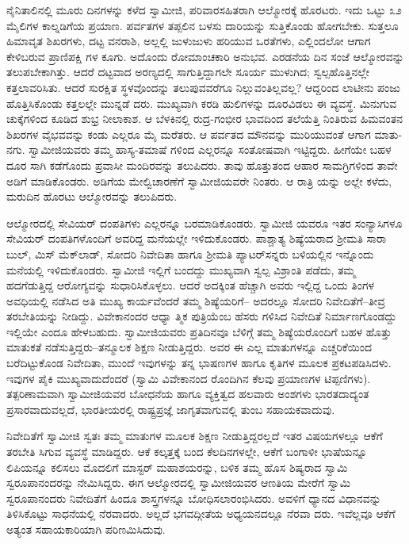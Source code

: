 ನೈನಿತಾಲಿನಲ್ಲಿ ಮೂರು ದಿನಗಳನ್ನು ಕಳೆದ ಸ್ವಾಮೀಜಿ, ಪರಿವಾರಸಹಿತರಾಗಿ ಆಲ್ಮೋರಕ್ಕೆ ಹೊರಟರು. ಇದು ಒಟ್ಟು ೩೨ ಮೈಲಿಗಳ ಕಾಲ್ನಡಿಗೆಯ ಪ್ರಯಾಣ. ಪರ್ವತಗಳ ತಪ್ಪಲಿನ ಬಳಸು ದಾರಿಯನ್ನು ಸುತ್ತಿಕೊಂಡು ಹೋಗಬೇಕು. ಸುತ್ತಲೂ ಹಿಮಾವೃತ ಶಿಖರಗಳು, ದಟ್ಟ ವನರಾಶಿ, ಅಲ್ಲಲ್ಲಿ ಜುಳುಜುಳು ಹರಿಯುವ ಒರತೆಗಳು, ಎಲ್ಲಿಂದಲೋ ಆಗಾಗ ಕೇಳಿಬರುವ ಪ್ರಾಣಿಪಕ್ಷಿ ಗಳ ಕೂಗು. ಅದೊಂದು ರೋಮಾಂಚಕಾರಿ ಅನುಭವ. ಎರಡನೆಯ ದಿನ ಸಂಜೆ ಆಲ್ಮೋರವನ್ನು ತಲುಪಬೇಕಾಗಿತ್ತು. ಆದರೆ ದಟ್ಟವಾದ ಅರಣ್ಯದಲ್ಲಿ ಸಾಗುತ್ತಿದ್ದಾಗಲೇ ಸೂರ್ಯ ಮುಳುಗಿದ; ಸ್ವಲ್ಪಹೊತ್ತಿನಲ್ಲೇ ಕತ್ತಲಾವರಿಸಿತು. ಆದರೆ ಸುರಕ್ಷಿತ ಸ್ಥಳವೊಂದನ್ನು ತಲುಪುವವರೆಗೂ ನಿಲ್ಲುವಂತಿಲ್ಲವಲ್ಲ? ಆದ್ದರಿಂದ ಲಾಟೀನು ಪಂಜು ಹೊತ್ತಿಸಿಕೊಂಡು ಕತ್ತಲಲ್ಲೇ ಮುನ್ನಡೆ ದರು. ಮುಖ್ಯವಾಗಿ ಕರಡಿ ಹುಲಿಗಳನ್ನು ದೂರವಿಡಲು ಈ ವ್ಯವಸ್ಥೆ. ಮಿನುಗುವ ಚುಕ್ಕೆಗಳಿಂದ ಕೂಡಿದ ಶುಭ್ರ ನೀಲಾಕಾಶ. ಆ ಬೆಳಕಿನಲ್ಲಿ ರುದ್ರ-ಗಂಭೀರ ಭಾವದಿಂದ ತಲೆಯೆತ್ತಿ ನಿಂತಿರುವ ಹಿಮವಂತನ ಶಿಖರಗಳ ವೈಭವವನ್ನು ಕಂಡು ಎಲ್ಲರೂ ಮೈ ಮರೆತರು. ಆ ಪರ್ವತದ ಮೌನವನ್ನು ಮುರಿಯುವಂತೆ ಆಗಾಗ ಮಾತು-ನಗು. ಸ್ವಾಮೀಜಿಯವರು ತಮ್ಮ ಹಾಸ್ಯ-ತಮಾಷೆ ಗಳಿಂದ ಎಲ್ಲರನ್ನೂ ಸಂತೋಷವಾಗಿ ಇಟ್ಟಿದ್ದರು. ಹೀಗೆಯೇ ಬಹಳ ದೂರ ಸಾಗಿ ಕಡೆಗೊಂದು ಪ್ರವಾಸೀ ಮಂದಿರವನ್ನು ತಲುಪಿದರು. ತಾವು ಹೊತ್ತುತಂದ ಆಹಾರ ಸಾಮಗ್ರಿಗಳಿಂದ ತಾವೇ ಅಡಿಗೆ ಮಾಡಿಕೊಂಡರು. ಅಡಿಗೆಯ ಮೇಲ್ವಿಚಾರಣೆಗೆ ಸ್ವಾಮೀಜಿಯವರೇ ನಿಂತರು. ಆ ರಾತ್ರಿ ಯನ್ನು ಅಲ್ಲೇ ಕಳೆದು, ಮರುದಿನ ಹೊರಟು ಆಲ್ಮೋರವನ್ನು ತಲುಪಿದರು.

ಆಲ್ಮೋರದಲ್ಲಿ ಸೇವಿಯರ್ ದಂಪತಿಗಳು ಎಲ್ಲರನ್ನೂ ಬರಮಾಡಿಕೊಂಡರು. ಸ್ವಾಮೀಜಿ ಯವರೂ ಇತರ ಸಂನ್ಯಾಸಿಗಳೂ ಸೇವಿಯರ್ ದಂಪತಿಗಳೊಂದಿಗೆ ಅವರಿದ್ದ ಮನೆಯಲ್ಲೇ ಇಳಿದುಕೊಂಡರು. ಪಾಶ್ಚಾತ್ಯ ಶಿಷ್ಯೆಯರಾದ ಶ್ರೀಮತಿ ಸಾರಾ ಬುಲ್, ಮಿಸ್ ಮೆಕ್​ಲಾಡ್, ಸೋದರಿ ನಿವೇದಿತಾ ಹಾಗೂ ಶ್ರೀಮತಿ ಪ್ಯಾಟರ್​ಸನ್ನರು ಬಳಿಯಲ್ಲಿನ ಇನ್ನೊಂದು ಮನೆಯಲ್ಲಿ ಇಳಿದುಕೊಂಡರು. ಸ್ವಾಮೀಜಿ ಇಲ್ಲಿಗೆ ಬಂದದ್ದು ಮುಖ್ಯವಾಗಿ ಸ್ವಲ್ಪ ವಿಶ್ರಾಂತಿ ಪಡೆದು, ತಮ್ಮ ಹದಗೆಡುತ್ತಿದ್ದ ಆರೋಗ್ಯವನ್ನು ಸುಧಾರಿಸಿಕೊಳ್ಳಲು. ಆದರೆ ಅದಕ್ಕಿಂತ ಹೆಚ್ಚಾಗಿ ಅವರು ಇಲ್ಲಿದ್ದ ಒಂದು ತಿಂಗಳ ಅವಧಿಯಲ್ಲಿ ನಡೆಸಿದ ಅತಿ ಮುಖ್ಯ ಕಾರ್ಯವೆಂದರೆ ತಮ್ಮ ಶಿಷ್ಯೆಯರಿಗೆ– ಅದರಲ್ಲೂ ಸೋದರಿ ನಿವೇದಿತೆಗೆ–ತೀವ್ರ ತರಬೇತಿಯನ್ನು ನೀಡಿದ್ದು. ವಿವೇಕಾನಂದರ ಆಧ್ಯಾ ತ್ಮಿಕ ಪುತ್ರಿಯೆಂಬ ಹೆಸರು ಗಳಿಸಿದ ನಿವೇದಿತೆ ನಿರ್ಮಾಣಗೊಂಡದ್ದು ಇಲ್ಲಿಯೇ ಎಂದೂ ಹೇಳಬಹುದು. ಸ್ವಾಮೀಜಿಯವರು ಪ್ರತಿದಿನವೂ ಬೆಳಿಗ್ಗೆ ತಮ್ಮ ಶಿಷ್ಯೆಯರೊಂದಿಗೆ ಬಹಳ ಹೊತ್ತು ಮಾತುಕತೆ ನಡೆಸುತ್ತಿದ್ದರು–ತನ್ಮೂಲಕ ಶಿಕ್ಷಣ ನೀಡುತ್ತಿದ್ದರು. ಅವರ ಈ ಎಲ್ಲ ಮಾತುಗಳನ್ನೂ ಎಚ್ಚರಿಕೆಯಿಂದ ಬರೆದಿಟ್ಟುಕೊಂಡ ನಿವೇದಿತಾ, ಮುಂದೆ ಇವುಗಳನ್ನು ತನ್ನ ಭಾಷಣಗಳ ಹಾಗೂ ಕೃತಿಗಳ ಮೂಲಕ ಪ್ರಕಟಪಡಿಸಿದಳು. ಇವುಗಳ ಪೈಕಿ ಮುಖ್ಯವಾದುದೆಂದರೆ  (ಸ್ವಾಮಿ ವಿವೇಕಾನಂದ ರೊಂದಿಗಿನ ಕೆಲವು ಪ್ರಯಾಣಗಳ ಟಿಪ್ಪಣಿಗಳು). ತತ್ಪರಿಣಾಮವಾಗಿ ಸ್ವಾಮೀಜಿಯವರ ಬೋಧನೆಯ ಹಾಗೂ ವ್ಯಕ್ತಿತ್ವದ ಹಲವಾರು ಅಂಶಗಳು ಭಾರತದಾದ್ಯಂತ ಪ್ರಸಾರವಾದುವಲ್ಲದೆ, ಭಾರತೀಯರಲ್ಲಿ ರಾಷ್ಟ್ರಪ್ರಜ್ಞೆ ಜಾಗೃತವಾಗುವಲ್ಲಿ ತುಂಬ ಸಹಾಯಕವಾದುವು.

ನಿವೇದಿತೆಗೆ ಸ್ವಾಮೀಜಿ ಸ್ವತಃ ತಮ್ಮ ಮಾತುಗಳ ಮೂಲಕ ಶಿಕ್ಷಣ ನೀಡುತ್ತಿದ್ದರಲ್ಲದೆ ಇತರ ವಿಷಯಗಳಲ್ಲೂ ಆಕೆಗೆ ತರಬೇತಿ ಸಿಗುವ ವ್ಯವಸ್ಥೆ ಮಾಡಿದ್ದರು. ಆಕೆ ಕಲ್ಕತ್ತಕ್ಕೆ ಬಂದ ಕೆಲದಿನಗಳಲ್ಲೇ, ಆಕೆಗೆ ಬಂಗಾಳೀ ಭಾಷೆಯನ್ನೂ ಲಿಪಿಯನ್ನೂ ಕಲಿಸಲು ಮೊದಲಿಗೆ ಮಾಸ್ಟರ್ ಮಹಾಶಯರನ್ನು, ಬಳಿಕ ತಮ್ಮ ಹೊಸ ಶಿಷ್ಯರಾದ ಸ್ವಾಮಿ ಸ್ವರೂಪಾನಂದರನ್ನು ನೇಮಿಸಿದ್ದರು. ಈಗ ಆಲ್ಮೋರದಲ್ಲಿ ಸ್ವಾಮೀಜಿಯವರ ಆಣತಿಯ ಮೇರೆಗೆ ಸ್ವಾಮಿ ಸ್ವರೂಪಾನಂದರು ನಿವೇದಿತೆಗೆ ಹಿಂದೂ ಶಾಸ್ತ್ರಗಳನ್ನೂ ಬೋಧಿಸಲಾರಂಭಿಸಿದರು. ಅವಳಿಗೆ ಧ್ಯಾನದ ವಿಧಾನವನ್ನು ತಿಳಿಸಿಕೊಟ್ಟು ಸಾಧನೆಯಲ್ಲಿ ನೆರವಾದರು. ಅಲ್ಲದೆ ಭಗವದ್ಗೀತೆಯ ಅಧ್ಯಯನದಲ್ಲೂ ನೆರವಾ ದರು. ಇವೆಲ್ಲವೂ ಆಕೆಗೆ ಅತ್ಯಂತ ಸಹಾಯಕಾರಿಯಾಗಿ ಪರಿಣಮಿಸಿದುವು.

